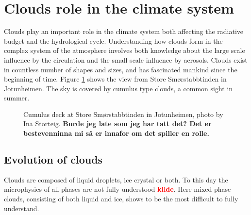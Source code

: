 \section{Clouds role in the climate system} \label{sec:cloud_in_climate_system}
Clouds play an important role in the climate system both affecting the radiative budget and the hydrological cycle. Understanding how clouds form in the complex system of the atmosphere involves both knowledge about the large scale influence by the circulation and the small scale influence by aerosols. Clouds exist in countless number of shapes and sizes, and has fascinated mankind since the beginning of time. Figure \ref{fig:cloud_cover_jotunheimen} shows the view from Store Smørstabbtinden in Jotunheimen. The sky is covered by cumulus type clouds, a common sight in summer.
\begin{figure}
    \centering
    \caption[Cumulus deck at Store Smørstabbtinden in Jotunheimen]{Cumulus deck at Store Smørstabbtinden in Jotunheimen, photo by Ina Storteig. \textbf{Burde jeg late som jeg har tatt det? Det er bestevenninna mi så er innafor om det spiller en rolle. }}
    \label{fig:cloud_cover_jotunheimen}
\end{figure}

\subsection{Evolution of clouds}
Clouds are composed of liquid droplets, ice crystal or both. To this day the microphysics of all phases are not fully understood \textcolor{red}{\textbf{kilde}}. Here mixed phase clouds, consisting of both liquid and ice, shows to be the most difficult to fully understand. 

